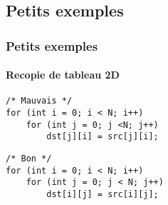 \documentclass[xcolor={x11names,svgnames}]{beamer}
\begin{document}

\subsection{Petits exemples}

\begin{frame}[label=applications,fragile=singleslide]
\frametitle{Petits exemples}
\framesubtitle{Recopie de tableau 2D}

\begin{verbatim}
/* Mauvais */
for (int i = 0; i < N; i++)
    for (int j = 0; j <N; j++)
        dst[j][i] = src[j][i];
\end{verbatim}

\bigskip

\begin{verbatim}
/* Bon */
for (int i = 0; i < N; i++)
    for (int j = 0; j < N; j++)
        dst[i][j] = src[i][j];
\end{verbatim}
\end{frame}

\end{document}
